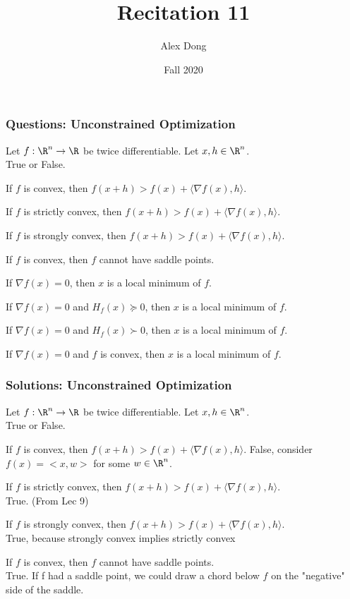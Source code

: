 \documentclass{beamer}
\title{Recitation 11}
\author{Alex Dong}
\institute{CDS, NYU}
\date{Fall 2020}
\renewenvironment{enumerate}%
{\begin{list}{\arabic{enumi}.}%
      {\setlength{\leftmargin}{2.5em}%
       \setlength{\itemsep}{-\parsep}%
       \setlength{\topsep}{-\parskip}%
       \usecounter{enumi}}%
 }{\end{list}}
\begin{document}
\frame{\titlepage} 

\begin{frame}
\frametitle{Questions: Unconstrained Optimization}
Let $f: \R^n \rightarrow \R$ be twice differentiable. Let $x,h\in \R^n$.\\
 True or False.
\begin{enumerate}
\item If $f$ is convex, then $f(x+h)>f(x)+\langle \nabla f(x),h \rangle$.
\item If $f$ is strictly convex, then $f(x+h)>f(x)+\langle \nabla f(x),h \rangle$.
\item If $f$ is strongly convex, then $f(x+h)>f(x)+\langle \nabla f(x),h \rangle$.
\item If $f$ is convex, then $f$ cannot have saddle points.
\item If $\nabla f(x) = 0$, then $x$ is a local minimum of $f$.
\item If $\nabla f(x) = 0$ and $H_f(x) \succeq 0$, then $x$ is a local minimum of $f$.
\item If $\nabla f(x) = 0$ and $H_f(x) \succ 0$, then $x$ is a local minimum of $f$.
\item If $\nabla f(x) = 0$ and $f$ is convex, then $x$ is a local minimum of $f$.
\end {enumerate}
\end{frame}

\begin{frame}
\frametitle{Solutions: Unconstrained Optimization}
Let $f: \R^n \rightarrow \R$ be twice differentiable. Let $x,h\in \R^n$.\\
 True or False.
\begin{solution}
\begin{enumerate}
\item If $f$ is convex, then $f(x+h)>f(x)+\langle \nabla f(x),h \rangle$.
False, consider $f(x) = <x,w>$ for some $w\in\R^n$. 
\item If $f$ is strictly convex, then $f(x+h)>f(x)+\langle \nabla f(x),h \rangle$.\\
True. (From Lec 9)
\item If $f$ is strongly convex, then $f(x+h)>f(x)+\langle \nabla f(x),h \rangle$.\\
True, because strongly convex implies strictly convex
\item If $f$ is convex, then $f$ cannot have saddle points.\\
True. If f had a saddle point, we could draw a chord below $f$ on the "negative" side of the saddle.
\end{enumerate}
\end{solution}
\end{frame}
\end{document}
